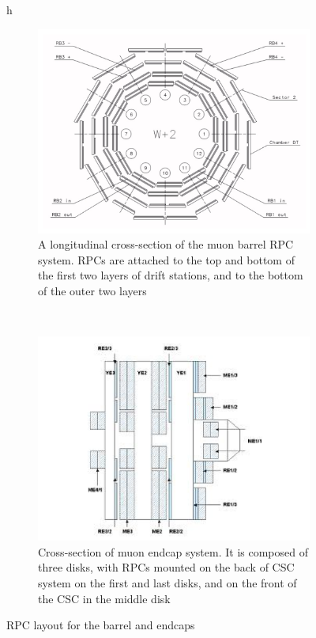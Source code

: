 \begin{figure}{h}
    \centering
    \begin{subfigure}[h]{0.40\textwidth}
        \includegraphics[width=\textwidth]{Figures/CMS_Diagrams/Muon__RPC_barrel_layout.pdf}
        \caption{A longitudinal cross-section of the muon barrel RPC
          system.  RPCs are attached to the top and bottom of the
          first two layers of drift stations, and to the bottom of the
        outer two layers \cite{CMS:CMS_Machine_Chatrchyan:2008aa}}\label{fig:muon_rpc_barrel_layout}
      \end{subfigure}
      ~ %
    \begin{subfigure}[h]{0.40\textwidth}
        \includegraphics[width=\textwidth]{Figures/CMS_Diagrams/Muon__RPC_endcap_layout.pdf}
        \caption{Cross-section of muon endcap system.  It is composed
          of three disks, with RPCs mounted on the back of CSC system
          on the first and last disks, and on the front of the CSC in
          the middle disk \cite{CMS:CMS_Machine_Chatrchyan:2008aa}}\label{fig:muon_rpc_endcap_layout}
      \end{subfigure}
      \caption{RPC layout for the barrel and endcaps}\label{fig:muon_rpc_layout}
\end{figure}

